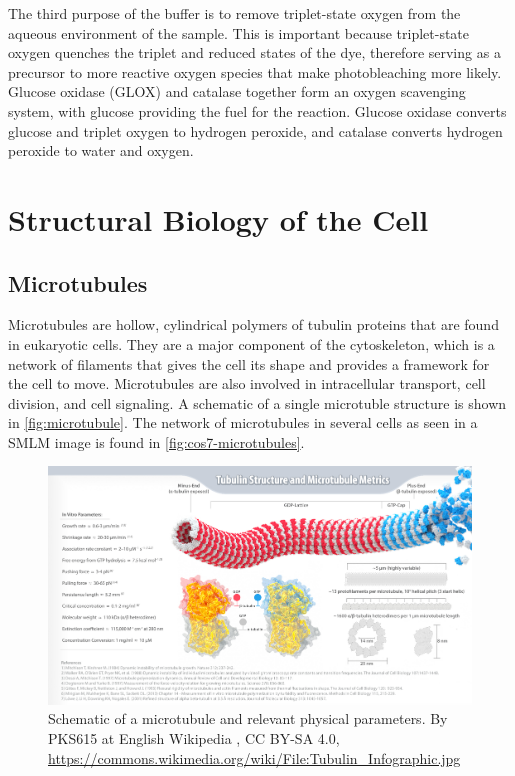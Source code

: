\documentclass[10pt,a4paper,oneside]{book}
\begin{document}
The third purpose of the buffer is to remove triplet-state oxygen from the aqueous environment of the sample. This is important because triplet-state oxygen quenches the triplet and reduced states of the dye, therefore serving as a precursor to more reactive oxygen species that make photobleaching more likely. Glucose oxidase (GLOX) and catalase together form an oxygen scavenging system, with glucose providing the fuel for the reaction. Glucose oxidase converts glucose and triplet oxygen to hydrogen peroxide, and catalase converts hydrogen peroxide to water and oxygen.

\chapter{Structural Biology of the Cell}

\section{Microtubules}

Microtubules are hollow, cylindrical polymers of tubulin proteins that are found in eukaryotic cells. They are a major component of the cytoskeleton, which is a network of filaments that gives the cell its shape and provides a framework for the cell to move. Microtubules are also involved in intracellular transport, cell division, and cell signaling. A schematic of a single microtuble structure is shown in \autoref{fig:microtubule}. The network of microtubules in several cells as seen in a SMLM image is found in \autoref{fig:cos7-microtubules}.

\begin{figure}[ht]
    \centering
    \includegraphics[width=1.0\textwidth]{tubulin-infographic.jpg}
    \caption{Schematic of a microtubule and relevant physical parameters. By PKS615 at English Wikipedia , CC BY-SA 4.0, \url{https://commons.wikimedia.org/wiki/File:Tubulin_Infographic.jpg}}
    \label{fig:microtubule}
\end{figure}
\end{document}
